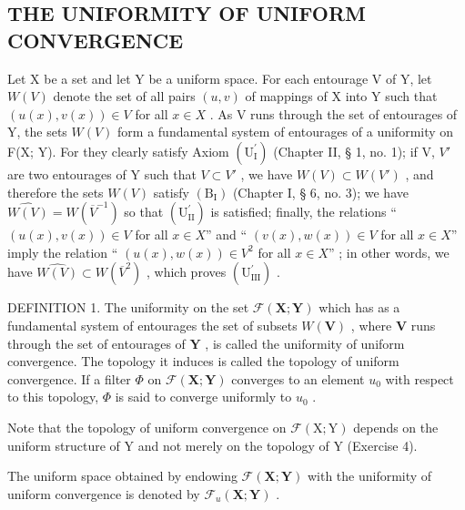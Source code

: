 \subsection{THE UNIFORMITY OF UNIFORM CONVERGENCE}

Let X be a set and let Y be a uniform space. For each entourage V of Y, let \(W(V)\) denote the set of all pairs \((u, v)\) of mappings of X into Y such that \((u(x), v(x)) \in V\) for all \(x \in X\) . As V runs through the set of entourages of Y, the sets \(W(V)\) form a fundamental system of entourages of a uniformity on F(X; Y). For they clearly satisfy Axiom \((\mathrm{U}_{\mathrm{I}}^{\prime})\) (Chapter II, § 1, no. 1); if V, \(V'\) are two entourages of Y such that \(V \subset V'\) , we have \(W(V) \subset W(V')\) , and therefore the sets \(W(V)\) satisfy \((\mathrm{B}_{\mathrm{I}})\) (Chapter I, § 6, no. 3); we have \(\widehat{W(V)} = W(\overline{V}^{-1})\) so that \((\mathrm{U}_{\mathrm{II}}^{\prime})\) is satisfied; finally, the relations `` \((u(x), v(x)) \in V\) for all \(x \in X\)'' and `` \((v(x), w(x)) \in V\) for all \(x \in X\)'' imply the relation `` \((u(x), w(x)) \in V^{2}\) for all \(x \in X\)'' ; in other words, we have \(\widehat{W(V)} \subset W(\overline{V}^{2})\) , which proves \((\mathrm{U}_{\mathrm{III}}^{\prime})\) .

DEFINITION 1. The uniformity on the set \(\mathcal{F}(\mathbf{X};\mathbf{Y})\) which has as a fundamental system of entourages the set of subsets \(W(\mathbf{V})\) , where \(\mathbf{V}\) runs through the set of entourages of \(\mathbf{Y}\) , is called the uniformity of uniform convergence. The topology it induces is called the topology of uniform convergence. If a filter \(\Phi\) on \(\mathcal{F}(\mathbf{X};\mathbf{Y})\) converges to an element \(u_0\) with respect to this topology, \(\Phi\) is said to converge uniformly to \(u_0\) .

Note that the topology of uniform convergence on \(\mathcal{F}(\mathrm{X};\mathrm{Y})\) depends on the uniform structure of Y and not merely on the topology of Y (Exercise 4).

The uniform space obtained by endowing \(\mathcal{F}(\mathbf{X};\mathbf{Y})\) with the uniformity of uniform convergence is denoted by \(\mathcal{F}_u(\mathbf{X};\mathbf{Y})\) .

